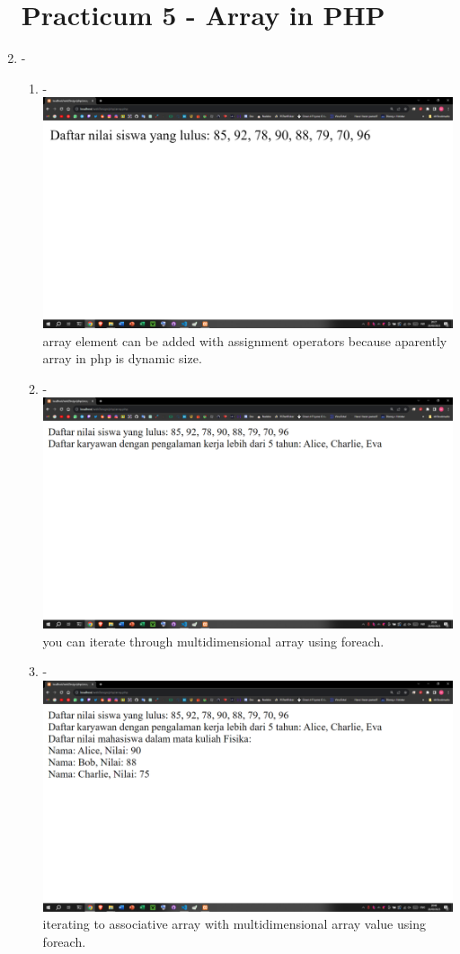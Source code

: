 \documentclass[12pt,titlepage]{article}
\begin{document}
\begin{enumerate}[label*=\arabic*.]
    \section*{Practicum 5  - Array in PHP}
    \item -
    \begin{enumerate}[label*=\arabic*.]
        \item - \\ \includegraphics[width=.8\textwidth]{images/figures/fig16.png} \\ array element can be added with assignment operators because aparently array in php is dynamic size.
        \item - \\ \includegraphics[width=.8\textwidth]{images/figures/fig17.png} \\ you can iterate through multidimensional array using foreach.
        \newpage
        \item - \\ \includegraphics[width=.8\textwidth]{images/figures/fig18.png} \\ iterating to associative array with multidimensional array value using foreach.

\end{enumerate}
\end{enumerate}
\end{document}

